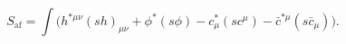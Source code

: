 \begin{equation}
\label{eq:Saf}
\boxed{S_{\mathrm{af}}
=\int\bigl(h^{*\mu\nu}(sh)_{\mu\nu}+\phi^*(s\phi)
-c^*_\mu(sc^\mu)-\bar c^{*\mu}(s\bar c_\mu)\bigr).}
\end{equation}
